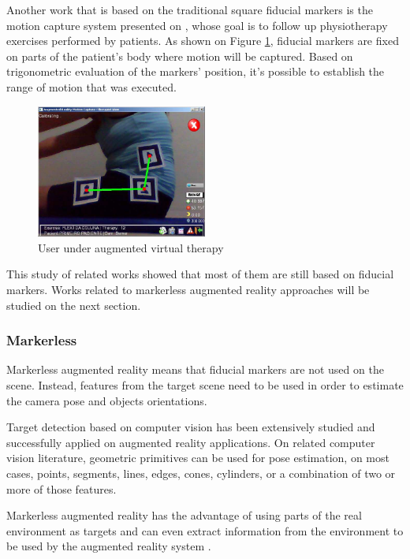 \documentclass[msc, a4paper, classic, en]{ufbathesis}
\begin{document}
Another work that is based on the traditional square fiducial markers is the motion capture system presented on \cite{fisio}, whose goal is to follow up physiotherapy exercises performed by patients. As shown on Figure \ref{fig:fisio}, fiducial markers are fixed on parts of the patient's body where motion will be captured. Based on trigonometric evaluation of the markers' position, it's possible to establish the range of motion that was executed.

\begin{figure}
\centering
\includegraphics[width=0.5\textwidth]{images/fisio.png}
\caption{User under augmented virtual therapy \cite{fisio}}
\label{fig:fisio}
\end{figure}

This study of related works showed that most of them are still based on fiducial markers. Works related to markerless augmented reality approaches will be studied on the next section.


\subsubsection{Markerless}

Markerless augmented reality means that fiducial markers are not used on the scene. Instead, features from the target scene need to be used in order to estimate the camera pose and objects orientations.

Target detection based on computer vision has been extensively studied and successfully applied on augmented reality applications. On related computer vision literature, geometric primitives can be used for pose estimation, on most cases, points, segments, lines, edges, cones, cylinders, or a combination of two or more of those features.

Markerless augmented reality has the advantage of using parts of the real environment as targets and can even extract information from the environment to be used by the augmented reality system \cite{dolz}.
\end{document}
